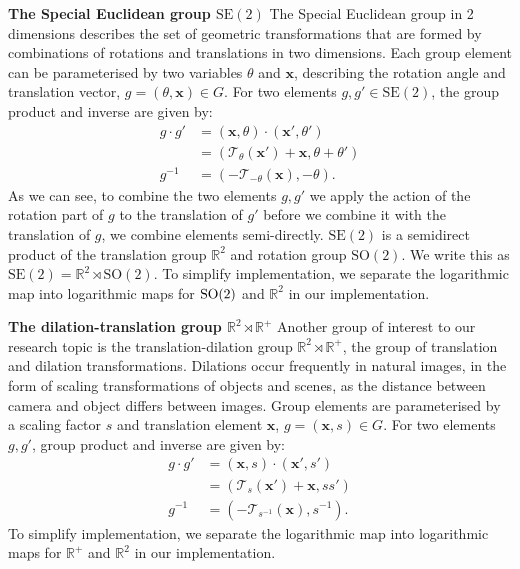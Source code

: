 \documentclass[nohyperref]{article}
\theoremstyle{plain}
\theoremstyle{definition}
\theoremstyle{remark}
\begin{document}
\textbf{The Special Euclidean group $\text{SE}(2)$}
The Special Euclidean group in 2 dimensions describes the set of geometric transformations that are formed by combinations of rotations and translations in two dimensions. Each group element can be parameterised by two variables $\theta$ and $\mathbf{x}$, describing the rotation angle and translation vector, $g=(\theta, \mathbf{x})\in G$. For two elements $g, g' \in \text{SE}(2)$, the group product and inverse are given by:
\begin{align}
    g\cdot g' &= (\mathbf{x},\theta) \cdot (\mathbf{x}',\theta') \nonumber \\
    &= (\mathcal{T}_\theta( \mathbf{x}') + \mathbf{x}, \theta + \theta')\\
    g^{-1} &= (-\mathcal{T}_{-\theta} (\mathbf{x}), -\theta).
\end{align}
As we can see, to combine the two elements $g, g'$ we apply the action of the rotation part of $g$ to the translation of $g'$ before we combine it with the translation of $g$, we combine elements semi-directly. $\text{SE}(2)$ is a semidirect product of the translation group $\mathbb{R}^2$ and rotation group $\text{SO}(2)$. We write this as $\text{SE}(2) = \mathbb{R}^2 \rtimes \text{SO}(2)$. To simplify implementation, we separate the logarithmic map into logarithmic maps for ${\rm SO(2)}$ and $\mathbb{R}^2$ in our implementation.

\textbf{The dilation-translation group $\mathbb{R}^2 \rtimes \mathbb{R}^+$}
Another group of interest to our research topic is the translation-dilation group $\mathbb{R}^2\rtimes \mathbb{R}^+$, the group of translation and dilation transformations. Dilations occur frequently in natural images, in the form of scaling transformations of objects and scenes, as the distance between camera and object differs between images. Group elements are parameterised by a scaling factor $s$ and translation element $\mathbf{x}$, $g=(\mathbf{x}, s)\in G$. For two elements $g, g'$, group product and inverse are given by:
\begin{align}
    g \cdot g' &= (\mathbf{x}, s) \cdot (\mathbf{x}', s') \nonumber \\
    &= (\mathcal{T}_s( \mathbf{x}') + \mathbf{x}, s  s')\\
    g^{-1} &= (-\mathcal{T}_{s^{-1}} (\mathbf{x}), s^{-1}).
\end{align}
To simplify implementation, we separate the logarithmic map into logarithmic maps for ${\mathbb{R}^+}$ and $\mathbb{R}^2$ in our implementation.
\end{document}
